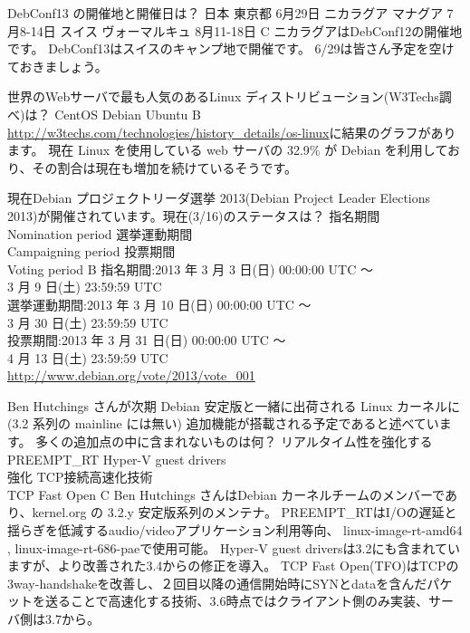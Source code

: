 %

\santaku
{DebConf13 の開催地と開催日は？}
{日本 東京都 6月29日}
{ニカラグア マナグア 7月8-14日}
{スイス ヴォーマルキュ 8月11-18日}
{C}
{ニカラグアはDebConf12の開催地です。
DebConf13はスイスのキャンプ地で開催です。
6/29は皆さん予定を空けておきましょう。}

\santaku
{世界のWebサーバで最も人気のあるLinux ディストリビューション(W3Techs調べ)は？}
{CentOS}
{Debian}
{Ubuntu}
{B}
{\url{http://w3techs.com/technologies/history_details/os-linux}に結果のグラフがあります。
現在 Linux を使用している web サーバの 32.9\% が Debian を利用しており、その割合は現在も増加を続けているそうです。}

\santaku
{現在Debian プロジェクトリーダ選挙 2013(Debian Project Leader Elections 2013)が開催されています。現在(3/16)のステータスは？}
{指名期間\\Nomination period}
{選挙運動期間\\Campaigning period}
{投票期間\\Voting period}
{B}
{指名期間:2013 年 3 月 3 日(日) 00:00:00 UTC 〜\\
3 月 9 日(土) 23:59:59 UTC
\\
選挙運動期間:2013 年 3 月 10 日(日) 00:00:00 UTC 〜\\
3 月 30 日(土) 23:59:59 UTC
\\
投票期間:2013 年 3 月 31 日(日) 00:00:00 UTC 〜\\
4 月 13 日(土) 23:59:59 UTC
\\
\url{http://www.debian.org/vote/2013/vote_001}}


\santaku
{Ben Hutchings さんが次期 Debian 安定版と一緒に出荷される Linux カーネルに (3.2 系列の mainline には無い) 追加機能が搭載される予定であると述べています。
多くの追加点の中に含まれないものは何？}
{リアルタイム性を強化するPREEMPT\_RT}
{Hyper-V guest drivers\\強化}
{TCP接続高速化技術\\TCP Fast Open}
{C}
{Ben Hutchings さんはDebian カーネルチームのメンバーであり、kernel.org の 3.2.y 安定版系列のメンテナ。
PREEMPT\_RTはI/Oの遅延と揺らぎを低減するaudio/videoアプリケーション利用等向、
linux-image-rt-amd64 , linux-image-rt-686-paeで使用可能。
Hyper-V guest driversは3.2にも含まれていますが、より改善された3.4からの修正を導入。
TCP Fast Open(TFO)はTCPの3way-handshakeを改善し、２回目以降の通信開始時にSYNとdataを含んだパケットを送ることで高速化する技術、3.6時点ではクライアント側のみ実装、サーバ側は3.7から。}

